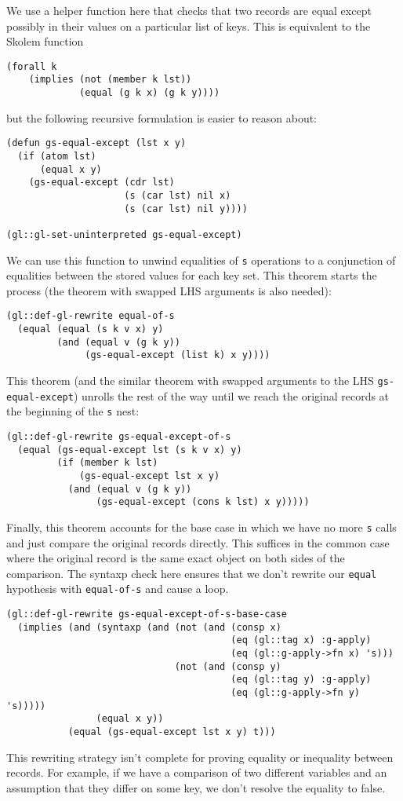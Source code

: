 \documentclass[submission,copyright,creativecommons]{eptcs}
\begin{document}
We use a helper function here that checks that two records are equal
except possibly in their values on a particular list of keys.  This is
equivalent to the Skolem function
\begin{verbatim}
(forall k
    (implies (not (member k lst))
             (equal (g k x) (g k y))))
\end{verbatim}
\noindent but the following recursive formulation is easier to reason
about:
\begin{verbatim}
(defun gs-equal-except (lst x y)
  (if (atom lst)
      (equal x y)
    (gs-equal-except (cdr lst)
                     (s (car lst) nil x)
                     (s (car lst) nil y))))

(gl::gl-set-uninterpreted gs-equal-except)
\end{verbatim}
We can use this function to unwind equalities of \texttt{s} operations
to a conjunction of equalities between the stored values for each key
set.  This theorem starts the process (the theorem with swapped LHS
arguments is also needed):
\begin{verbatim}
(gl::def-gl-rewrite equal-of-s
  (equal (equal (s k v x) y)
         (and (equal v (g k y))
              (gs-equal-except (list k) x y))))
\end{verbatim}
This theorem (and the similar theorem with swapped arguments to the LHS
\texttt{gs-equal-except}) unrolls the rest of the way until we reach
the original records at the beginning of the \texttt{s} nest:
\begin{verbatim}
(gl::def-gl-rewrite gs-equal-except-of-s
  (equal (gs-equal-except lst (s k v x) y)
         (if (member k lst)
             (gs-equal-except lst x y)
           (and (equal v (g k y))
                (gs-equal-except (cons k lst) x y)))))
\end{verbatim}
Finally, this theorem accounts for the base case in which we have no
more \texttt{s} calls and just compare the original records directly.
This suffices in the common case where the original record is the same
exact object on both sides of the comparison.
The syntaxp check here ensures that we don't rewrite our
\texttt{equal} hypothesis with \texttt{equal-of-s} and cause a loop.
\begin{verbatim}
(gl::def-gl-rewrite gs-equal-except-of-s-base-case
  (implies (and (syntaxp (and (not (and (consp x)
                                        (eq (gl::tag x) :g-apply)
                                        (eq (gl::g-apply->fn x) 's)))
                              (not (and (consp y)
                                        (eq (gl::tag y) :g-apply)
                                        (eq (gl::g-apply->fn y) 's)))))
                (equal x y))
           (equal (gs-equal-except lst x y) t)))
\end{verbatim}
This rewriting strategy isn't complete for proving equality or
inequality between records.  For example, if we have a comparison of
two different variables and an assumption that they differ on some
key, we don't resolve the equality to false.
\end{document}
